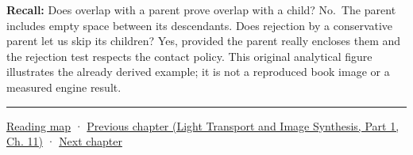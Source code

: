 \textbf{Recall:} Does overlap with a parent prove overlap with a child? No.~The parent includes empty space between its descendants. Does rejection by a conservative parent let us skip its children? Yes, provided the parent really encloses them and the rejection test respects the contact policy. This original analytical figure illustrates the already derived example; it is not a reproduced book image or a measured engine result.

\begin{center}\rule{0.5\linewidth}{0.5pt}\end{center}

\hyperref[volume-reading-map]{Reading map} · \href{../04-Light-Transport-and-Image-Synthesis-P01/main.pdf\#nameddest=06-engine-ii-ch032-terrain-materials-and-image-composition}{Previous chapter (Light Transport and Image Synthesis, Part 1, Ch. 11)} · \hyperref[06-engine-ii-ch034-rigid-body-motion-from-forces-to-contact]{Next chapter}
